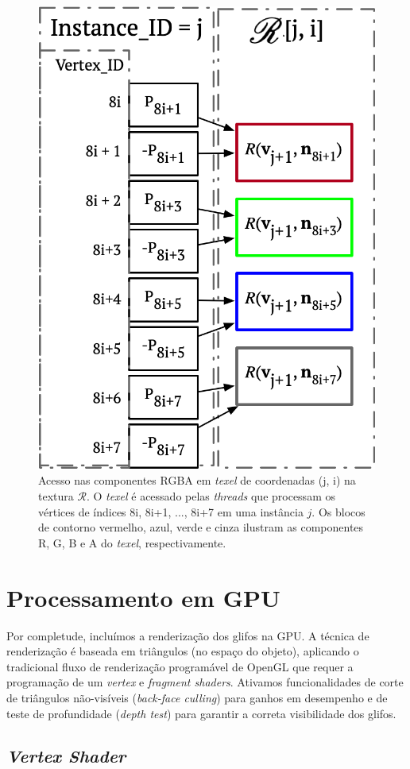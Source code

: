 \begin{figure}[ht]
    \centering
    \includegraphics[width=.45\linewidth, angle=0]{figs/Esquema_Glifo/texel_lookup_6.png}
    \caption{Acesso nas componentes RGBA em \textit{texel} de coordenadas (j, i) na textura $\mathscr{R}$. O \textit{texel} é acessado pelas \textit{threads} que processam os vértices de índices 8i, 8i+1, ..., 8i+7 em uma instância $j$. Os blocos de contorno vermelho, azul, verde e cinza ilustram as componentes R, G, B e A do \textit{texel}, respectivamente.}
    \label{fig::texelfetch}
\end{figure}
\section{Processamento em GPU}
\label{sec::processamento_GPU}

Por completude, incluímos a renderização dos glifos na GPU. A técnica de renderização é baseada em triângulos (no espaço do objeto), aplicando o tradicional fluxo de renderização programável de OpenGL que requer a programação de um \textit{vertex} e \textit{fragment shaders}. Ativamos funcionalidades de corte de triângulos não-visíveis (\textit{back-face culling}) para ganhos em desempenho e de teste de profundidade (\textit{depth test}) para garantir a correta visibilidade dos glifos.


\subsection{\textit{Vertex Shader}}
\label{ssec::vertex_shader}


